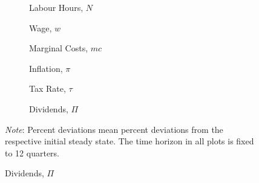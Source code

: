 \documentclass[12pt]{article} %
\numberwithin{equation}{section} %
\numberwithin{figure}{section}
\numberwithin{table}{section}
\begin{document}
\begin{refsection}
\begin{appendices}
\begin{figure}[H]
    \caption{Supplement for Figure \ref{fig:baseline-permanent-limit-agg}}%
    \label{fig:baseline-permanent-limit-agg-extra}
    \begin{subfigure}[b]{0.49\textwidth}
     \caption{Labour Hours, $N$}
     \label{fig:baseline-permanent-limit-agg-N}
         \centering
         
     \end{subfigure}
     \hfill
     \begin{subfigure}[b]{0.49\textwidth}
     \caption{Wage, $w$}
     \label{fig:baseline-permanent-limit-agg-w}
         \centering
         
     \end{subfigure}
     \hfill
     \begin{subfigure}[b]{0.49\textwidth}
     \centering
     \caption{Marginal Costs, $mc$}
     \label{fig:baseline-permanent-limit-agg-mc}
         
     \end{subfigure}
     \hfill
     \begin{subfigure}[b]{0.49\textwidth}
     \centering
     \caption{Inflation, $\pi$}
     \label{fig:baseline-permanent-limit-agg-pi}
         
     \end{subfigure}
     \hfill
    \begin{subfigure}[b]{0.49\textwidth}
    \caption{Tax Rate, $\tau$}
    \label{fig:baseline-permanent-limit-agg-tau}
         \centering
         
     \end{subfigure}
     \hfill
     \begin{subfigure}[b]{0.49\textwidth}
     \caption{Dividends, $\Pi$}
     \label{fig:baseline-permanent-limit-agg-Pi}
         \centering
         
     \end{subfigure}
     \begin{flushleft}
     \footnotesize
	\textit{Note}: Percent deviations mean percent deviations from the respective initial steady state. The time horizon in all plots is fixed to 12 quarters.
	\end{flushleft}
\end{figure}


\end{appendices}
\end{refsection}
\end{document}
